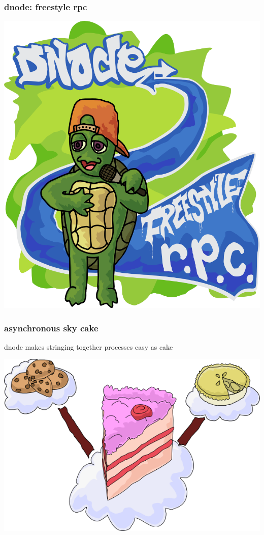 \documentclass{beamer}
\begin{document}
\begin{frame}
    \frametitle{dnode: freestyle rpc}
    \begin{center}
        \includegraphics[scale=0.3]{images/freestyle_turtle.png}
    \end{center}
\end{frame}

\begin{frame}
    \begin{center}
        \frametitle{asynchronous sky cake}
        \huge

        dnode makes stringing together processes easy as cake
        \newline

        \includegraphics[scale=0.5]{images/sky_cake.png}
    \end{center}
\end{frame}
\end{document}
